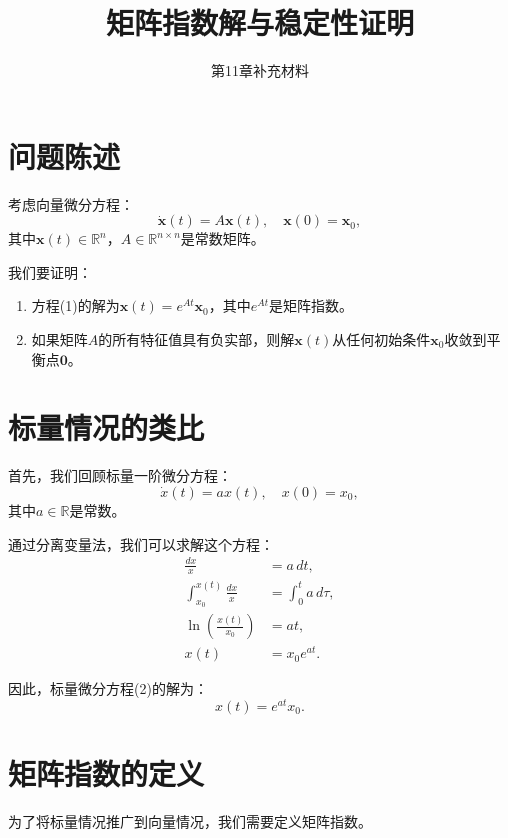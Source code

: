 \documentclass[12pt,a4paper]{article}
\title{矩阵指数解与稳定性证明}
\author{第11章补充材料}
\date{}
\begin{document}
\maketitle

\section{问题陈述}

考虑向量微分方程：
\begin{equation}
\dot{\mathbf{x}}(t) = A\mathbf{x}(t), \quad \mathbf{x}(0) = \mathbf{x}_0,
\end{equation}
其中$\mathbf{x}(t) \in \mathbb{R}^n$，$A \in \mathbb{R}^{n \times n}$是常数矩阵。

我们要证明：
\begin{enumerate}
\item 方程(1)的解为$\mathbf{x}(t) = e^{At}\mathbf{x}_0$，其中$e^{At}$是矩阵指数。
\item 如果矩阵$A$的所有特征值具有负实部，则解$\mathbf{x}(t)$从任何初始条件$\mathbf{x}_0$收敛到平衡点$\mathbf{0}$。
\end{enumerate}

\section{标量情况的类比}

首先，我们回顾标量一阶微分方程：
\begin{equation}
\dot{x}(t) = ax(t), \quad x(0) = x_0,
\end{equation}
其中$a \in \mathbb{R}$是常数。

通过分离变量法，我们可以求解这个方程：
\begin{align}
\frac{dx}{x} &= a \, dt, \\
\int_{x_0}^{x(t)} \frac{dx}{x} &= \int_0^t a \, d\tau, \\
\ln\left(\frac{x(t)}{x_0}\right) &= at, \\
x(t) &= x_0 e^{at}.
\end{align}

因此，标量微分方程(2)的解为：
\begin{equation}
x(t) = e^{at}x_0.
\end{equation}

\section{矩阵指数的定义}

为了将标量情况推广到向量情况，我们需要定义矩阵指数。
\end{document}
